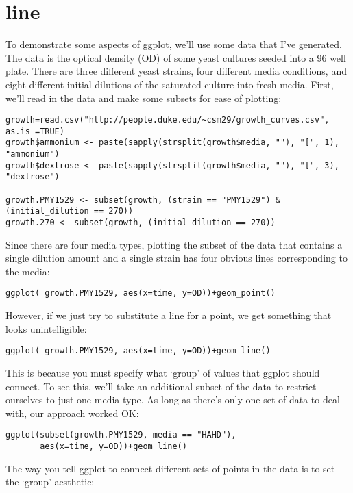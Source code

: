 \documentclass[11pt]{article}
\begin{document}
\section{line}
\label{sec-6}


To demonstrate some aspects of ggplot, we'll use some data that I've
generated. The data is the optical density (OD) of some yeast cultures
seeded into a 96 well plate. There are three different yeast strains,
four different media conditions, and eight different initial dilutions
of the saturated culture into fresh media. First, we'll read in the
data and make some subsets for ease of plotting:

\begin{verbatim}
growth=read.csv("http://people.duke.edu/~csm29/growth_curves.csv", as.is =TRUE)
growth$ammonium <- paste(sapply(strsplit(growth$media, ""), "[", 1), "ammonium")
growth$dextrose <- paste(sapply(strsplit(growth$media, ""), "[", 3), "dextrose")

growth.PMY1529 <- subset(growth, (strain == "PMY1529") & (initial_dilution == 270))
growth.270 <- subset(growth, (initial_dilution == 270))
\end{verbatim}

Since there are four media types, plotting the subset of the data that
contains a single dilution amount and a single strain has four obvious
lines corresponding to the media:

\begin{verbatim}
ggplot( growth.PMY1529, aes(x=time, y=OD))+geom_point()
\end{verbatim}


However, if we just try to substitute a line for a point, we get
something that looks unintelligible:

\begin{verbatim}
ggplot( growth.PMY1529, aes(x=time, y=OD))+geom_line()
\end{verbatim}


This is because you must specify what `group' of values that ggplot
should connect. To see this, we'll take an additional subset of the
data to restrict ourselves to just one media type. As long as there's
only one set of data to deal with, our approach worked OK:

\begin{verbatim}
ggplot(subset(growth.PMY1529, media == "HAHD"),
       aes(x=time, y=OD))+geom_line()
\end{verbatim}


The way you tell ggplot to connect different sets of points in the
data is to set the `group' aesthetic:
\end{document}
